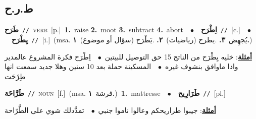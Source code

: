 \documentclass[10pt,a4paper,twoside]{article} %
\begin{document}
\begin{multicols}{2}
\vspace{-3mm}
\subsection*{\color{blue}\foreignlanguage{arabic}{ط.ر.ح}\color{blue}{}} 

{\setlength\topsep{0pt}\textbf{\foreignlanguage{arabic}{طَرَح}}\ {\color{gray}\texttt{//}\color{black}}\ \textsc{verb}\ [p.]\ \textbf{1.}~raise  \textbf{2.}~moot  \textbf{3.}~subtract  \textbf{4.}~abort\ \ $\bullet$\ \ \setlength\topsep{0pt}\textbf{\foreignlanguage{arabic}{اِطْرَح}}\ {\color{gray}\texttt{//}\color{black}}\ [c.]\ \ $\bullet$\ \ \setlength\topsep{0pt}\textbf{\foreignlanguage{arabic}{يِطْرَح}}\ {\color{gray}\texttt{//}\color{black}}\ [i.]\ \color{gray}(msa. \foreignlanguage{arabic}{يُجهِض}~\foreignlanguage{arabic}{\textbf{٣.}}  .\foreignlanguage{arabic}{يطرح (رياضيات)}~\foreignlanguage{arabic}{\textbf{٢.}}  .\foreignlanguage{arabic}{يَطْرَح (سؤال أو موضوع)}~\foreignlanguage{arabic}{\textbf{١.}})\color{black}\  \begin{flushright}\color{gray}\foreignlanguage{arabic}{\textbf{\underline{\foreignlanguage{arabic}{أمثلة}}}: خليه يِطْرَح من الناتج 15 حق التوصيل للبيتين\ $\bullet$\ \  اِطْرَح فكرة المشروع عالمدير واذا ماوافق بنشوف غيره\ $\bullet$\ \  المسكينة حملة بعد 10 سنين وهلا جديد سمعت انها طِرْحَت}\end{flushright}\color{black}} \vspace{2mm}

{\setlength\topsep{0pt}\textbf{\foreignlanguage{arabic}{طَرَّاحَة}}\ {\color{gray}\texttt{//}\color{black}}\ \textsc{noun}\ [f.]\ \color{gray}(msa. \foreignlanguage{arabic}{فرشة}~\foreignlanguage{arabic}{\textbf{١.}})\color{black}\ \textbf{1.}~mattresse\ \ $\bullet$\ \ \setlength\topsep{0pt}\textbf{\foreignlanguage{arabic}{طَرَارِيح}}\ {\color{gray}\texttt{//}\color{black}}\ [pl.]\  \begin{flushright}\color{gray}\foreignlanguage{arabic}{\textbf{\underline{\foreignlanguage{arabic}{أمثلة}}}: جيبوا طراريحكم وعالوا ناموا جنبي\ $\bullet$\ \  تمدَّدلك شوي على الطَّرّاحة}\end{flushright}\color{black}} \vspace{2mm}


\end{multicols}
\end{document}
